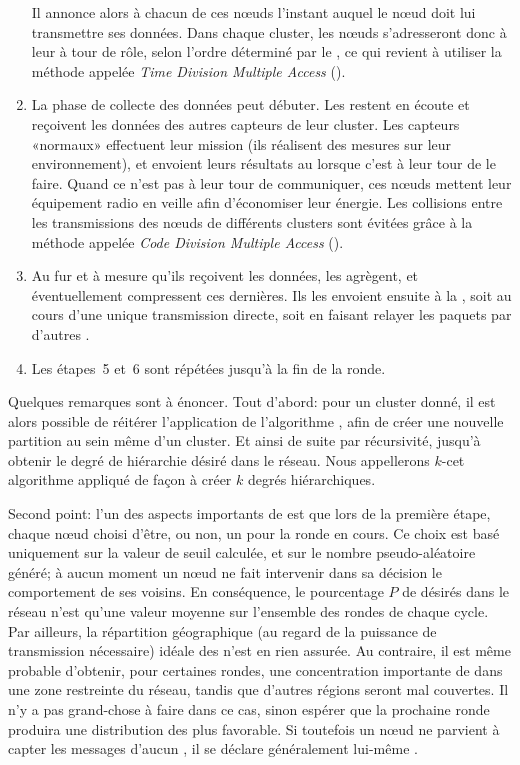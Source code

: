 \begin{enumerate}
        Il annonce alors à chacun de ces nœuds l'instant auquel le nœud doit lui transmettre ses données.
        Dans chaque cluster, les nœuds s'adresseront donc à leur \ch à tour de rôle, selon l'ordre déterminé par le \CH, ce qui revient à utiliser la méthode appelée \textit{Time Division Multiple Access} (\tdma).
    \item La phase de collecte des données peut débuter.
        Les \chs restent en écoute et reçoivent les données des autres capteurs de leur cluster.
        Les capteurs «normaux» effectuent leur mission (ils réalisent des mesures sur leur environnement), et envoient leurs résultats au \ch lorsque c'est à leur tour de le faire.
        Quand ce n'est pas à leur tour de communiquer, ces nœuds mettent leur équipement radio en veille afin d'économiser leur énergie.
        Les collisions entre les transmissions des nœuds de différents clusters sont évitées grâce à la méthode appelée \textit{Code Division Multiple Access} (\cdma).
    \item Au fur et à mesure qu'ils reçoivent les données, les \chs agrègent, et éventuellement compressent ces dernières.
        Ils les envoient ensuite à la \sdb, soit au cours d'une unique transmission directe, soit en faisant relayer les paquets par d'autres \chs.
    \item Les étapes~5 et~6 sont répétées jusqu'à la fin de la ronde.
\end{enumerate}

Quelques remarques sont à énoncer.
Tout d'abord: pour un cluster donné, il est alors possible de réitérer l'application de l'algorithme \leach, afin de créer une nouvelle partition au sein même d'un cluster.
Et ainsi de suite par récursivité, jusqu'à obtenir le degré de hiérarchie désiré dans le réseau.
Nous appellerons $k$-\leach cet algorithme appliqué de façon à créer $k$ degrés hiérarchiques.

Second point: l'un des aspects importants de \leach est que lors de la première étape, chaque nœud choisi d'être, ou non, un \ch pour la ronde en cours.
Ce choix est basé uniquement sur la valeur de seuil calculée, et sur le nombre pseudo-aléatoire généré; à aucun moment un nœud ne fait intervenir dans sa décision le comportement de ses voisins.
En conséquence, le pourcentage $P$ de \chs désirés dans le réseau n'est qu'une valeur moyenne sur l'ensemble des rondes de chaque cycle.
Par ailleurs, la répartition géographique (au regard de la puissance de transmission nécessaire) idéale des \chs n'est en rien assurée.
Au contraire, il est même probable d'obtenir, pour certaines rondes, une concentration importante de \chs dans une zone restreinte du réseau, tandis que d'autres régions seront mal couvertes.
Il n'y a pas grand-chose à faire dans ce cas, sinon espérer que la prochaine ronde produira une distribution des \CHs plus favorable.
Si toutefois un nœud ne parvient à capter les messages d'aucun \CH, il se déclare généralement lui-même \ch.

